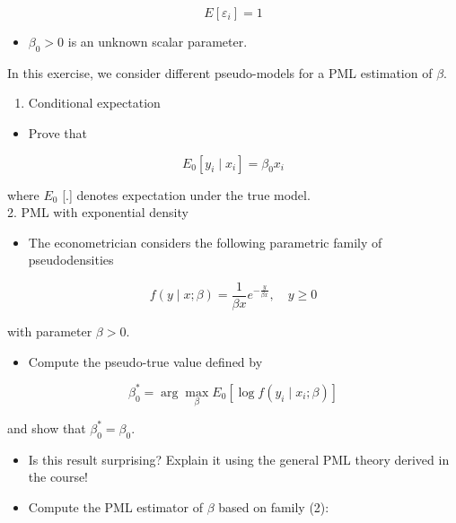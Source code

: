$$
E\left[\varepsilon_{i}\right]=1
$$

\begin{itemize}
  \item $\beta_{0}>0$ is an unknown scalar parameter.
\end{itemize}

In this exercise, we consider different pseudo-models for a PML estimation of $\beta$.

\begin{enumerate}
  \item Conditional expectation
\end{enumerate}

\begin{itemize}
  \item Prove that
\end{itemize}

$$
E_{0}\left[y_{i} \mid x_{i}\right]=\beta_{0} x_{i}
$$

where $E_{0}$ [.] denotes expectation under the true model.\\
2. PML with exponential density

\begin{itemize}
  \item The econometrician considers the following parametric family of pseudodensities
\end{itemize}


\begin{equation*}
f(y \mid x ; \beta)=\frac{1}{\beta x} e^{-\frac{y}{\beta x}}, \quad y \geq 0 \tag{2}
\end{equation*}


with parameter $\beta>0$.

\begin{itemize}
  \item Compute the pseudo-true value defined by
\end{itemize}

$$
\beta_{0}^{*}=\arg \max _{\beta} E_{0}\left[\log f\left(y_{i} \mid x_{i} ; \beta\right)\right]
$$

and show that $\beta_{0}^{*}=\beta_{0}$.

\begin{itemize}
  \item Is this result surprising? Explain it using the general PML theory derived in the course!
  \item Compute the PML estimator of $\beta$ based on family (2):
\end{itemize}

